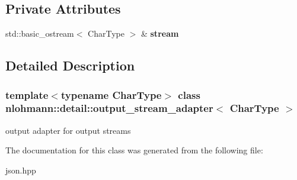 \subsection*{Private Attributes}
\begin{DoxyCompactItemize}
\item 
\mbox{\label{classnlohmann_1_1detail_1_1output__stream__adapter_aacc26af02e1e5a988bc5dbfb723b5562}} 
std\+::basic\+\_\+ostream$<$ Char\+Type $>$ \& {\bfseries stream}
\end{DoxyCompactItemize}


\subsection{Detailed Description}
\subsubsection*{template$<$typename Char\+Type$>$\newline
class nlohmann\+::detail\+::output\+\_\+stream\+\_\+adapter$<$ Char\+Type $>$}

output adapter for output streams 

The documentation for this class was generated from the following file\+:\begin{DoxyCompactItemize}
\item 
json.\+hpp\end{DoxyCompactItemize}
